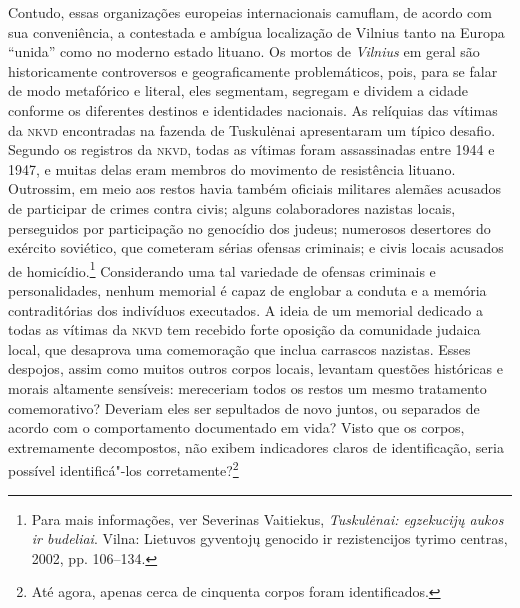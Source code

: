 Contudo, essas organizações europeias internacionais camuflam, de
acordo com sua conveniência, a contestada e ambígua localização de
Vilnius tanto na Europa ``unida'' como no moderno estado lituano. Os
mortos de \textit{Vilnius} em geral são historicamente controversos e
geograficamente problemáticos, pois, para se falar de modo metafórico e
literal, eles segmentam, segregam e dividem a cidade conforme os
diferentes destinos e identidades nacionais. As relíquias das vítimas da
\textsc{nkvd} encontradas na fazenda de Tuskulėnai apresentaram um típico
desafio. Segundo os registros da \textsc{nkvd}, todas as vítimas foram
assassinadas entre 1944 e 1947, e muitas delas eram membros do movimento
de resistência lituano. Outrossim, em meio aos restos havia também
oficiais militares alemães acusados de participar de crimes contra
civis; alguns colaboradores nazistas locais, perseguidos por
participação no genocídio dos judeus; numerosos desertores do exército
soviético, que cometeram sérias ofensas criminais; e civis locais
acusados de homicídio.\footnote{Para mais informações, ver Severinas Vaitiekus, \textit{Tuskulėnai: egzekucijų aukos ir budeliai}. Vilna: Lietuvos gyventojų genocido ir rezistencijos tyrimo centras, 2002, pp. 106--134.} Considerando uma tal variedade de ofensas criminais e personalidades, nenhum memorial é capaz de englobar a conduta e a
memória contraditórias dos indivíduos executados. A ideia de um memorial
dedicado a todas as vítimas da \textsc{nkvd} tem recebido forte oposição da
comunidade judaica local, que desaprova uma comemoração que inclua
carrascos nazistas. Esses despojos, assim como muitos outros corpos
locais, levantam questões históricas e morais altamente sensíveis:
mereceriam todos os restos um mesmo tratamento comemorativo? Deveriam
eles ser sepultados de novo juntos, ou separados de acordo com o
comportamento documentado em vida? Visto que os corpos, extremamente
decompostos, não exibem indicadores claros de identificação, seria
possível identificá"-los corretamente?\footnote{Até agora, apenas cerca de
cinquenta corpos foram identificados.}

